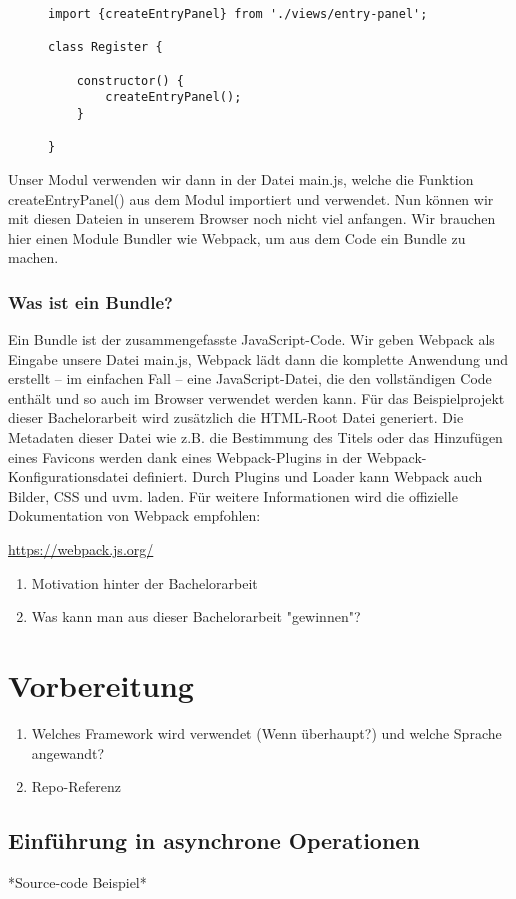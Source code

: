 \begin{figure}[H]
\begin{lstlisting}
import {createEntryPanel} from './views/entry-panel';

class Register {

    constructor() {
        createEntryPanel();
    }
    
}
\end{lstlisting}
\end{figure}

Unser Modul verwenden wir dann in der Datei main.js, welche die Funktion createEntryPanel() aus dem Modul importiert und verwendet. Nun können wir mit diesen Dateien in unserem Browser noch nicht viel anfangen. Wir brauchen hier einen Module Bundler wie Webpack, um aus dem Code ein Bundle zu machen.

\subsubsection{Was ist ein Bundle?}

Ein Bundle ist der zusammengefasste JavaScript-Code. Wir geben Webpack als Eingabe unsere Datei main.js, Webpack lädt dann die komplette Anwendung und erstellt – im einfachen Fall – eine JavaScript-Datei, die den vollständigen Code enthält und so auch im Browser verwendet werden kann.\cite{Webpack-basics}
Für das Beispielprojekt dieser Bachelorarbeit wird zusätzlich die HTML-Root Datei generiert. Die Metadaten dieser Datei wie z.B. die Bestimmung des Titels oder das Hinzufügen eines Favicons werden dank eines Webpack-Plugins in der Webpack-Konfigurationsdatei definiert. Durch Plugins und Loader kann Webpack auch Bilder, CSS und uvm. laden.
Für weitere Informationen wird die offizielle Dokumentation von Webpack empfohlen:

\begin{center}
\url{https://webpack.js.org/}
\end{center}

\begin{enumerate} 
\item Motivation hinter der Bachelorarbeit
\item Was kann man aus dieser Bachelorarbeit "gewinnen"?
\end{enumerate}

\section{Vorbereitung}
\begin{enumerate} 
\item Welches Framework wird verwendet (Wenn überhaupt?) und welche Sprache angewandt?
\item Repo-Referenz
\end{enumerate}

\subsection{Einführung in asynchrone Operationen}
*Source-code Beispiel*